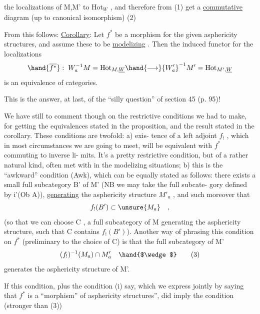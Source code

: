 
the localizations of M,M' to $\mathrm{Hot}_{\underline{W}}$ , and therefore from (1) get a
\uline{commutative} diagram (up to canonical isomorphism)
(2)

From this follows:
\uline{Corollary}: Let $f^{*}$ be a morphism for the given asphericity structures,
and assume these to be \uline{modelizing} . Then the induced functor for the
localizations
\[ \hand{\overline{f^{*}}} : \; W_{a}^{-1}M = \mathrm{Hot}_{M,\underline{W}} \hand{\longrightarrow} {W'_{a}}^{-1}M' = \mathrm{Hot}_{M',\underline{W}} \]
is an equivalence of categories.

This is the answer, at last, of the ``silly question'' of section
45 (p. 95)!

We have still to comment though on the restrictive conditions we had
to make, for getting the equivalences stated in the proposition, and the
result stated in the corollary. These conditions are twofold: a) exis-%
tence of a left adjoint $f_{!}$ , which in most circumstances we are going
to meet, will  be equivalent with $f^{*}$ commuting to inverse li-%
mits. It's a pretty restrictive condition, but of a rather natural kind,
often met with in the modelizing situations; b) this is the ``awkward''
condition (Awk), which can be equally stated as follows: there exists
a  small full subcategory B' of M' (NB we may take the full subcate-%
gory defined by i'(Ob A)), \uline{generating} the asphericity structure $M'_{a}$ ,
and such moreover that
\[ f_{!}(B') \subset \unsure{M_{a}} \quad , \]
(so that we can choose C , a  full subcategory of M generating
the asphericity structure, such that C contains $f_{!}(B')$). Another way of
phrasing this condition on $f^{*}$ (preliminary to the choice of C) is
that the full subcategory of M'
\[ (f_{!})^{-1}(M_{a}) \cap M'_{a} \quad \hand{$\wedge$} \tag{3} \]
  generates the asphericity structure of M'.

If this condition, plus the condition (i) say, which we express
jointly by saying that $f^{*}$ is a ``morphism'' of asphericity structures'', did
imply the condition (stronger than (3))

